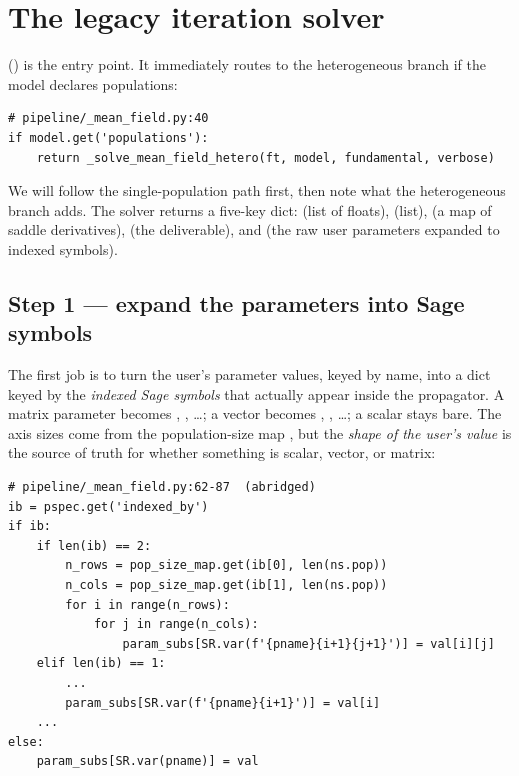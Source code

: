 \section{The legacy iteration solver}

() is the entry point. It immediately routes to the
heterogeneous branch if the model declares populations:

\begin{lstlisting}
# pipeline/_mean_field.py:40
if model.get('populations'):
    return _solve_mean_field_hetero(ft, model, fundamental, verbose)
\end{lstlisting}

We will follow the single-population path first, then note what the
heterogeneous branch adds. The solver returns a five-key dict:
 (list of floats),  (list),
 (a  map of saddle derivatives),
 (the deliverable), and  (the raw user
parameters expanded to indexed symbols).

\subsection{Step 1 --- expand the parameters into Sage symbols}

The first job is to turn the user's parameter values, keyed by name, into a dict
keyed by the \emph{indexed Sage symbols} that actually appear inside the
propagator. A matrix parameter  becomes , , \dots; a
vector becomes , , \dots; a scalar stays bare. The axis sizes
come from the population-size map , but the \emph{shape of
the user's value} is the source of truth for whether something is scalar, vector,
or matrix:

\begin{lstlisting}
# pipeline/_mean_field.py:62-87  (abridged)
ib = pspec.get('indexed_by')
if ib:
    if len(ib) == 2:
        n_rows = pop_size_map.get(ib[0], len(ns.pop))
        n_cols = pop_size_map.get(ib[1], len(ns.pop))
        for i in range(n_rows):
            for j in range(n_cols):
                param_subs[SR.var(f'{pname}{i+1}{j+1}')] = val[i][j]
    elif len(ib) == 1:
        ...
        param_subs[SR.var(f'{pname}{i+1}')] = val[i]
    ...
else:
    param_subs[SR.var(pname)] = val
\end{lstlisting}

